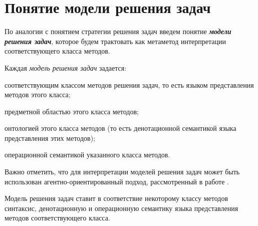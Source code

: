 \section{Понятие модели решения задач}
\label{sec_problem_solving_model}

По аналогии с понятием стратегии решения задач введем понятие \textbf{\textit{модели решения задач}}, которое будем трактовать как метаметод интерпретации соответствующего класса методов.

\begin{SCn}
	\begin{scnindent}
	\end{scnindent}
\end{SCn}

Каждая \textit{модель решения задач} задается:
\begin{textitemize}
	\item соответствующим классом методов решения задач, то есть языком представления методов этого класса;
	\item предметной областью этого класса методов;
	\item онтологией этого класса методов (то есть денотационной семантикой языка представления этих методов);
	\item операционной семантикой указанного класса методов.
\end{textitemize}

Важно отметить, что для интерпретации  моделей решения задач может быть использован агентно-ориентированный подход, рассмотренный в работе .

Модель решения задач ставит в соответствие некоторому классу методов синтаксис, денотационную и операционную семантику языка представления методов соответствующего класса.

